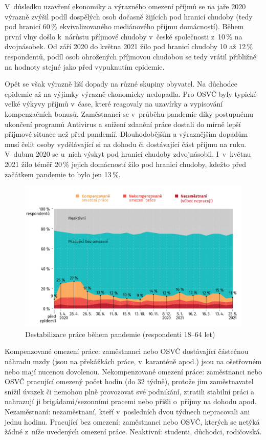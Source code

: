 V důsledku uzavření ekonomiky a výrazného omezení příjmů se na jaře 2020 výrazně zvýšil podíl dospělých osob dočasně žijících pod hranicí chudoby (tedy pod hranicí 60\,\% ekvivalizovaného mediánového příjmu domácností). Během první vlny došlo k nárůstu
příjmové chudoby v české společnosti z 10\,\% na dvojnásobek. Od září 2020 do května 2021 žilo pod hranicí chudoby 10 až 12\,\% respondentů, podíl osob ohrožených příjmovou chudobou se tedy vrátil přibližně na hodnoty stejné jako před vypuknutím epidemie.

Opět se však výrazně liší dopady na různé skupiny obyvatel. Na důchodce epidemie až na výjimky výrazně ekonomicky nedopadla. Pro OSVČ byly typické velké výkyvy příjmů v čase, které reagovaly na uzavírky a vypisování kompenzačních bonusů. Zaměstnanci se v průběhu pandemie díky postupnému ukončení programů Antivirus a snížení zdanění práce dostali do mírně lepší příjmové situace než před pandemií. Dlouhodobějším a výraznějším dopadům musí čelit osoby vydělávající si na dohodu či dostávající část příjmu na ruku. V dubnu 2020 se u~nich výskyt pod hranicí chudoby zdvojnásobil. I~v květnu 2021 žilo téměř 20\,\% jejich domácností žilo pod hranicí chudoby, kdežto před začátkem pandemie to bylo jen 13\,\%.


\begin{figure}[ht]
    \centering
    \includegraphics[width=\textwidth]{./pic/zbp-graf1.png}
    \caption{Destabilizace práce během pandemie (respondenti 18--64 let)}
    \label{fig:zbp1}
\end{figure}

Kompenzované omezení práce: zaměstnanci nebo OSVČ dostávající částečnou náhradu mzdy (jsou na překážkách práce, v~karanténě apod.) jsou na ošetřovném nebo mají nucenou dovolenou. Nekompenzované omezení práce: zaměstnanci nebo OSVČ pracující omezený počet hodin (do 32 týdně), protože jim zaměstnavatel snížil úvazek či nemohou plně provozovat své podnikání, ztratili stabilní práci a nahrazují ji brigádami/sezonními pracemi nebo přišli o~příjmy na dohodu apod. Nezaměstnaní: nezaměstnaní, kteří v~posledních dvou týdnech nepracovali ani jednu hodinu. Pracující bez omezení: zaměstnanci nebo OSVČ, kterých se netýká žádné z~níže uvedených omezení práce. Neaktivní: studenti, důchodci, rodičovská.

